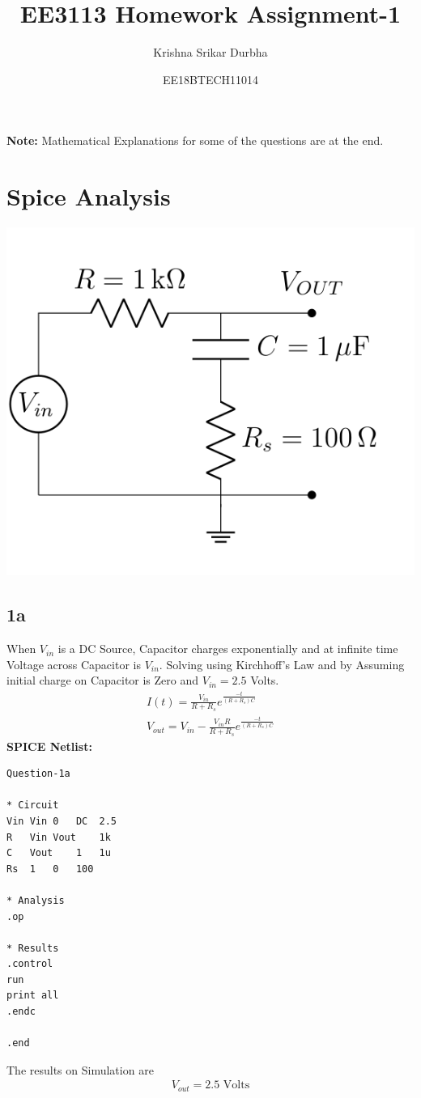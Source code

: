 \documentclass{article}
\title{EE3113 Homework Assignment-1}
\author{Krishna Srikar Durbha}
\date{EE18BTECH11014}
\begin{document}
\maketitle
\vspace{0.1in}
\textbf{Note:} Mathematical Explanations for some of the questions are at the end. 
\section{Spice Analysis}
\begin{center}
    \includegraphics[scale=0.35]{Images/1.png}
\end{center}

\subsection{1a}
When $V_{in}$ is a DC Source, Capacitor charges exponentially and at infinite time Voltage across Capacitor is $V_{in}$.
Solving using Kirchhoff's Law and by Assuming initial charge on Capacitor is Zero and $V_{in} = 2.5$ Volts.
\begin{align}
    I(t) = \frac{V_{in}}{R+R_{s}}e^{\frac{-t}{(R+R_{s})C}} \\
    V_{out} = V_{in} - \frac{V_{in}R}{R+R_{s}} e^{\frac{-t}{(R+R_{s})C}}
\end{align}
\textbf{SPICE Netlist:}
\begin{lstlisting}
Question-1a

* Circuit
Vin	Vin	0	DC	2.5
R	Vin	Vout	1k
C	Vout	1	1u
Rs	1	0	100

* Analysis
.op

* Results
.control
run
print all
.endc

.end
\end{lstlisting}
The results on Simulation are\\
\begin{align}
    V_{out} = 2.5 \text{ Volts}
\end{align}
\end{document}
